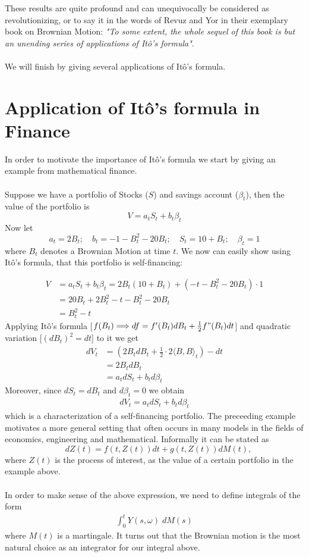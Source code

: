 \documentclass[11pt,a4paper, final]{article}
\theoremstyle{definition}
\begin{document}
\noindent These results are quite profound and can unequivocally be considered as revolutionizing, or to say it in the words of Revuz and Yor in their exemplary book on Brownian Motion: \textit{"To some extent, the whole sequel of this book is but an unending series of applications of Itô's formula"}.
\\\\
We will finish by giving several applications of Itô's formula. 


\section{Application of Itô's formula in Finance}
In order to motivate the importance of Itô's formula we start by giving an example from mathematical finance. \\
\\
Suppose we have a portfolio of Stocks ($S$) and savings account ($\beta_t$), then the value of the portfolio is
$$ V=a_t S_t + b_t \beta_t $$
Now let $$a_t=2 B_t;\quad b_t=-1-B_t^2-20 B_t;\quad S_t=10+B_t;\quad \beta_t=1$$
where $B_t$ denotes a Brownian Motion at time $t$.
We now can easily show using Itô's formula, that this portfolio is self-financing:

\begin{align*} V&=a_t S_t + b_t \beta_t = 2 B_t(10+B_t) +(-t-B_t^2-20B_t)\cdot 1\\
&=20B_t + 2B_t^2-t-B_t^2-20B_t \\
&=B_t^2-t 
\end{align*}
Applying Itô's formula [$f(B_t) \Longrightarrow df=f'(B_t)dB_t + \frac{1}{2} f"(B_t)dt$] and quadratic variation [$(dB_t)^2=dt$] to it we get
\begin{align*}  dV_t &= (2B_t dB_t + \frac{1}{2}\cdot 2 \langle B, B \rangle_t)-dt\\
&= 2 B_t dB_t\\
&= a_t dS_t + b_t d\beta_t
\end{align*}
Moreover, since $dS_t = dB_t$ and $d\beta_t=0$ we obtain
\begin{align*}dV_t = a_t dS_t + b_t d\beta_t \end{align*}
which is a characterization of a self-financing portfolio.
\newpage
\noindent The preceeding example motivates a more general setting that often occurs in many models in the fields of economics, engineering and mathematical. Informally it can be stated as
$$ \quad dZ(t) = f(t, Z(t))dt + g(t,Z(t)) dM(t), $$
where $Z(t)$ is the process of interest, as the value of a certain portfolio in the example above.\\
\\
In order to make sense of the above expression, we need to define integrals of the form
\begin{align*} \int_0^t Y(s,\omega) \; dM(s) \tag{$\star$} 
\end{align*}
where $M(t)$ is a martingale. It turns out that the Brownian motion is the most natural choice as an integrator for our integral above. 
\end{document}

